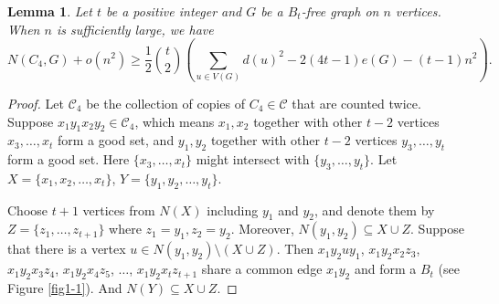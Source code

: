 \documentclass[11pt,a4paper]{article}
\newtheorem{lemma}{Lemma}[section]
\theoremstyle{definition}
\begin{document}
        \begin{lemma}\label{lem: better lower bound of Bt}
            Let $t$ be a positive integer and $G$ be a $B_t$-free graph on $n$ vertices. When $n$ is sufficiently large, we have
            \begin{equation*}
                N(C_4, G) + o(n^2) \geq \frac{1}{2} \binom{t}{2} \left(\sum_{u \in V(G)} d(u)^2 - 2(4t-1) e(G) - (t-1) n^2 \right).
            \end{equation*}
        \end{lemma}
        \begin{proof}

        Let $\mathcal{C}_4$ be the collection of copies of $C_4 \in \mathcal{C}$ that are counted twice.
        Suppose $x_1y_1x_2y_2 \in \mathcal{C}_4$,
        which means $x_1,x_2$ together with other $t-2$ vertices $x_3,\dots, x_t$ form a good set, and $y_1,y_2$ together with other $t-2$ vertices $y_3,\dots,y_t$ form a good set.
        Here $\{x_3,\dots,x_t\}$ might intersect with $\{y_3,\dots,y_t\}$.
        Let $X = \{x_1, x_2, \dots, x_t\}$, $Y = \{y_1, y_2, \dots, y_t\}$.


        Choose $t+1$ vertices from $N(X)$ including $y_1$ and $y_2$, and denote them by $Z=\{z_1,\dots,z_{t+1}\}$ where $z_1=y_1,z_2=y_2$.
        Moreover, $N(y_1,y_2)\subseteq X\cup Z$.
        Suppose that there is a vertex $u \in N(y_1,y_2)\setminus(X\cup Z)$. Then $x_1 y_2 u y_1$, $x_1 y_2 x_2 z_3$, $x_1 y_2 x_3 z_4$, $x_1 y_2 x_4 z_5$, $\dots$, $x_1 y_2 x_t z_{t+1}$ share a common edge $x_1 y_2$ and form a $B_t$ (see Figure \ref{fig1-1}). 
        And $N(Y)\subseteq X\cup Z.$


\end{proof}
\end{document}
